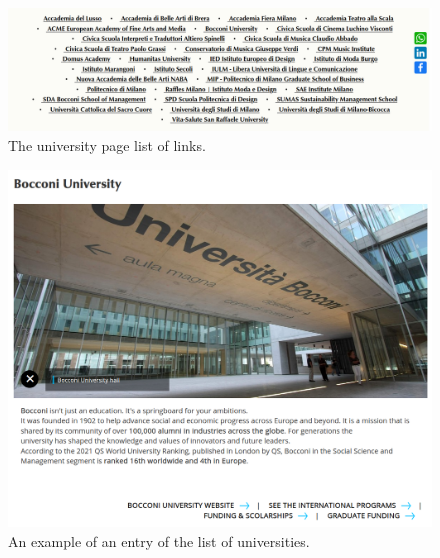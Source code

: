 \begin{itemize}
    \begin{figure}[!ht]
        \includegraphics[width=\linewidth]{images/MC1-1.png}
        \caption{The university page list of links.}
        \label{fig:MC1-1}
    \end{figure}
    \begin{figure}[!ht]
        \centering
        \includegraphics[width=0.7\linewidth]{images/MC1-2.png}
        \caption{An example of an entry of the list of universities.}
        \label{fig:MC1-2}
    \end{figure}
      

\end{itemize}
